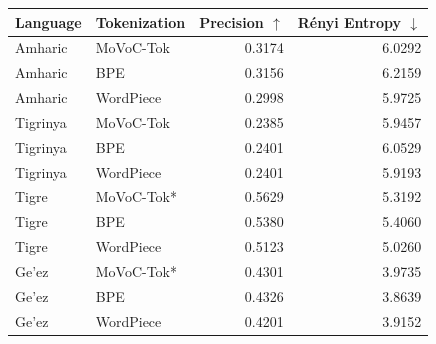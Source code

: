 \begin{tabular}{llrr}
\hline
Language & Tokenization & Precision $\uparrow$ & R\'enyi Entropy $\downarrow$ \\
\hline
Amharic & MoVoC-Tok & 0.3174 & 6.0292 \\
Amharic & BPE & 0.3156 & 6.2159 \\
Amharic & WordPiece & 0.2998 & 5.9725 \\
Tigrinya & MoVoC-Tok & 0.2385 & 5.9457 \\
Tigrinya & BPE & 0.2401 & 6.0529 \\
Tigrinya & WordPiece & 0.2401 & 5.9193 \\
Tigre & MoVoC-Tok* & 0.5629 & 5.3192 \\
Tigre & BPE & 0.5380 & 5.4060 \\
Tigre & WordPiece & 0.5123 & 5.0260 \\
Ge'ez & MoVoC-Tok* & 0.4301 & 3.9735 \\
Ge'ez & BPE & 0.4326 & 3.8639 \\
Ge'ez & WordPiece & 0.4201 & 3.9152 \\
\hline
\end{tabular}
